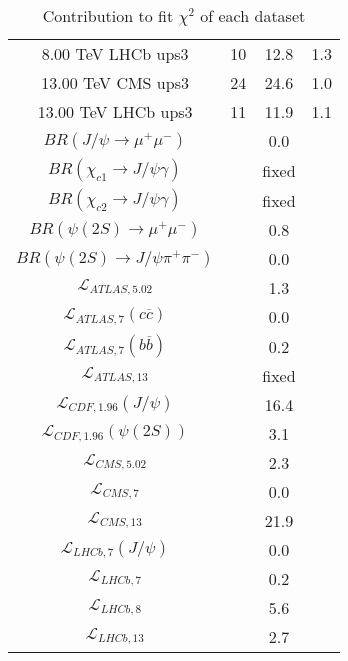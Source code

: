 \begin{table}[h!]
\begin{tabular}{c|c|c|c}
8.00 TeV LHCb ups3 & 10 & 12.8 & 1.3 \\
13.00 TeV CMS ups3 & 24 & 24.6 & 1.0 \\
13.00 TeV LHCb ups3 & 11 & 11.9 & 1.1 \\
\hline
$BR(J/\psi\rightarrow\mu^+\mu^-)$ &  & 0.0 &  \\
$BR(\chi_{c1}\rightarrow J/\psi\gamma)$ &  & fixed & \\
$BR(\chi_{c2}\rightarrow J/\psi\gamma)$ &  & fixed & \\
$BR(\psi(2S)\rightarrow\mu^+\mu^-)$ &  & 0.8 &  \\
$BR(\psi(2S)\rightarrow J/\psi\pi^+\pi^-)$ &  & 0.0 &  \\
$\mathcal L_{ATLAS,5.02}$ &  & 1.3 &  \\
$\mathcal L_{ATLAS,7}(c\overline c)$ &  & 0.0 &  \\
$\mathcal L_{ATLAS,7}(b\overline b)$ &  & 0.2 &  \\
$\mathcal L_{ATLAS,13}$ &  & fixed & \\
$\mathcal L_{CDF,1.96}(J/\psi)$ &  & 16.4 &  \\
$\mathcal L_{CDF,1.96}(\psi(2S))$ &  & 3.1 &  \\
$\mathcal L_{CMS,5.02}$ &  & 2.3 &  \\
$\mathcal L_{CMS,7}$ &  & 0.0 &  \\
$\mathcal L_{CMS,13}$ &  & 21.9 &  \\
$\mathcal L_{LHCb,7}(J/\psi)$ &  & 0.0 &  \\
$\mathcal L_{LHCb,7}$ &  & 0.2 &  \\
$\mathcal L_{LHCb,8}$ &  & 5.6 &  \\
$\mathcal L_{LHCb,13}$ &  & 2.7 &  \\
\end{tabular}
\caption{Contribution to fit $\chi^2$ of each dataset}
\end{table}
